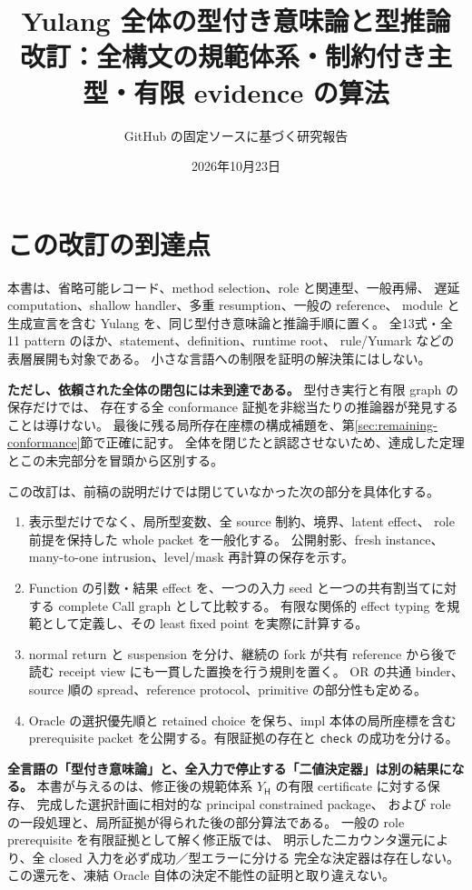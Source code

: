 \documentclass[11pt,a4paper]{article}
\title{Yulang 全体の型付き意味論と型推論\\[.5em]\large 改訂：全構文の規範体系・制約付き主型・有限 evidence の算法}
\author{GitHub の固定ソースに基づく研究報告}
\date{2026年10月23日}
\theoremstyle{remark}
\begin{document}
\maketitle

\section*{この改訂の到達点}

本書は、省略可能レコード、method selection、role と関連型、一般再帰、
遅延 computation、shallow handler、多重 resumption、一般の reference、
module と生成宣言を含む Yulang を、同じ型付き意味論と推論手順に置く。
全13式・全11 pattern のほか、statement、definition、runtime root、
rule/Yumark などの表層展開も対象である。
小さな言語への制限を証明の解決策にはしない。

\textbf{ただし、依頼された全体の閉包には未到達である。}
型付き実行と有限 graph の保存だけでは、
存在する全 conformance 証拠を非総当たりの推論器が発見することは導けない。
最後に残る局所存在座標の構成補題を、第\ref{sec:remaining-conformance}節で正確に記す。
全体を閉じたと誤認させないため、達成した定理とこの未完部分を冒頭から区別する。

この改訂は、前稿の説明だけでは閉じていなかった次の部分を具体化する。
\begin{enumerate}
\item 表示型だけでなく、局所型変数、全 source 制約、境界、latent effect、
role 前提を保持した whole packet を一般化する。
公開射影、fresh instance、many-to-one intrusion、level/mask 再計算の保存を示す。
\item Function の引数・結果 effect を、一つの入力 seed と一つの共有割当てに対する
complete Call graph として比較する。
有限な関係的 effect typing を規範として定義し、その least fixed point を実際に計算する。
\item normal return と suspension を分け、継続の fork が共有 reference から後で読む
receipt view にも一貫した置換を行う規則を置く。
OR の共通 binder、source 順の spread、reference protocol、primitive の部分性も定める。
\item Oracle の選択優先順と retained choice を保ち、impl 本体の局所座標を含む
prerequisite packet を公開する。有限証拠の存在と \texttt{check} の成功を分ける。
\end{enumerate}

\textbf{全言語の「型付き意味論」と、全入力で停止する「二値決定器」は別の結果になる。}
本書が与えるのは、修正後の規範体系 \(Y_{\mathsf H}\) の有限 certificate に対する保存、
完成した選択計画に相対的な principal constrained package、
および role の一段処理と、局所証拠が得られた後の部分算法である。
一般の role prerequisite を有限証拠として解く修正版では、
明示した二カウンタ還元により、全 closed 入力を必ず成功／型エラーに分ける
完全な決定器は存在しない。
この還元を、凍結 Oracle 自体の決定不能性の証明と取り違えない。
\end{document}
